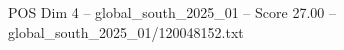 \begin{textsample}{POS Dim 4 – global\_south\_2025\_01 – Score 27.00 – global\_south\_2025\_01/120048152.txt}
\end{textsample}
